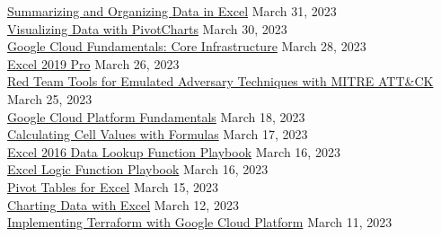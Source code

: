 \documentclass[10pt]{res} %
\begin{document}
\begin{resume}
\href{https://bjdelacruz.dev/files/certificates/pluralsight/Summarizing_and_Organizing_Data_in_Excel.pdf}{\color{blue}Summarizing and Organizing Data in Excel} \hfill March 31, 2023 \\
\href{https://bjdelacruz.dev/files/certificates/pluralsight/Visualizing_Data_with_PivotCharts.pdf}{\color{blue}Visualizing Data with PivotCharts} \hfill March 30, 2023 \\
\href{https://bjdelacruz.dev/files/certificates/pluralsight/Google_Cloud_Fundamentals_Core_Infrastructure.pdf}{\color{blue}Google Cloud Fundamentals: Core Infrastructure} \hfill March 28, 2023 \\
\href{https://bjdelacruz.dev/files/certificates/pluralsight/Excel_2019_Pro.pdf}{\color{blue}Excel 2019 Pro} \hfill March 26, 2023 \\
\href{https://bjdelacruz.dev/files/certificates/pluralsight/1_Red_Team_Tools_for_Emulated_Adversary_Techniques_with_MITRE_ATT_CK.pdf}{\color{blue}Red Team Tools for Emulated Adversary Techniques with MITRE ATT\&CK} \hfill March 25, 2023 \\
\href{https://bjdelacruz.dev/files/certificates/pluralsight/Google_Cloud_Platform_Fundamentals.pdf}{\color{blue}Google Cloud Platform Fundamentals} \hfill March 18, 2023 \\
\href{https://bjdelacruz.dev/files/certificates/pluralsight/Calculating_Cell_Values_with_Formulas.pdf}{\color{blue}Calculating Cell Values with Formulas} \hfill March 17, 2023 \\
\href{https://bjdelacruz.dev/files/certificates/pluralsight/Excel_2016_Data_Lookup_Function_Playbook.pdf}{\color{blue}Excel 2016 Data Lookup Function Playbook} \hfill March 16, 2023 \\
\href{https://bjdelacruz.dev/files/certificates/pluralsight/Excel_Logic_Function_Playbook.pdf}{\color{blue}Excel Logic Function Playbook} \hfill March 16, 2023 \\
\href{https://bjdelacruz.dev/files/certificates/pluralsight/Pivot_Tables_for_Excel.pdf}{\color{blue}Pivot Tables for Excel} \hfill March 15, 2023 \\
\href{https://bjdelacruz.dev/files/certificates/pluralsight/Charting_Data_with_Excel.pdf}{\color{blue}Charting Data with Excel} \hfill March 12, 2023 \\
\href{https://bjdelacruz.dev/files/certificates/pluralsight/Implementing_Terraform_with_Google_Cloud_Platform.pdf}{\color{blue}Implementing Terraform with Google Cloud Platform} \hfill March 11, 2023 \\

\end{resume}
\end{document}
